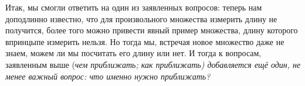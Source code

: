 Итак, мы смогли ответить на один из заявленных вопросов: теперь нам доподлинно известно, что для произвольного
множества измерить длину не получится, более того можно привести явный пример множества, длину которого впринцыпе
измерить нельзя. Но тогда мы, встречая новое множество даже не знаем, можем ли мы посчитать его длину или нет.
И тогда к вопросам, заявленным выше (\it{чем приближать; как приближать}) добавляется ещё один, не менее важный
вопрос: \it{что именно нужно приближать?}